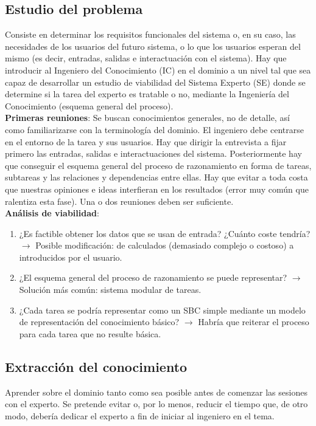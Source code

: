 \documentclass[12pt]{article}
\begin{document}
\subsection{Estudio del problema}
Consiste en determinar los requisitos funcionales del sistema o, en su caso, las necesidades de los usuarios del futuro sistema, o lo que los usuarios esperan del mismo (es decir, entradas, salidas e interactuación con el sistema). Hay que introducir al Ingeniero del Conocimiento (IC) en el dominio a un nivel tal que sea capaz de desarrollar un estudio de viabilidad del Sistema Experto (SE) donde se determine si la tarea del experto es tratable o no, mediante la Ingeniería del Conocimiento (esquema general del proceso).\\

\textbf{Primeras reuniones}: Se buscan conocimientos generales, no de detalle, así como familiarizarse con la terminología del dominio. El ingeniero debe centrarse en el entorno de la tarea y sus usuarios. Hay que dirigir la entrevista a fijar primero las entradas, salidas e interactuaciones del sistema. Posteriormente hay que conseguir el esquema general del proceso de razonamiento en forma de tareas, subtareas y las relaciones y dependencias entre ellas. Hay que evitar a toda costa que nuestras opiniones e ideas interfieran en los resultados (error muy común que ralentiza esta fase). Una o dos reuniones deben ser suficiente.\\

\textbf{Análisis de viabilidad}: 
\begin{enumerate}
\item ¿Es factible obtener los datos que se usan de entrada? ¿Cuánto coste tendría? $\longrightarrow$ Posible modificación: de calculados (demasiado complejo o costoso) a introducidos por el usuario.
\item ¿El esquema general del proceso de razonamiento se puede representar? $\longrightarrow$ Solución más común: sistema modular de tareas.
\item ¿Cada tarea se podría representar como un SBC simple mediante un modelo de representación del conocimiento básico? $\longrightarrow$ Habría que reiterar el proceso para cada tarea que no resulte básica.
\end{enumerate}

\subsection{Extracción del conocimiento}
Aprender sobre el dominio tanto como sea posible antes de comenzar las sesiones con el experto. Se pretende evitar o, por lo menos, reducir el tiempo que, de otro modo, debería dedicar el experto a fin de iniciar al ingeniero en el tema.\\
\end{document}
